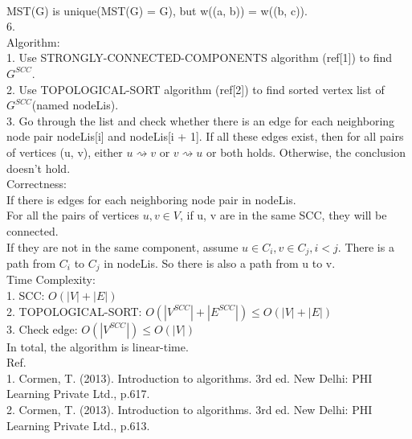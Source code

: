 \documentclass{article}
\begin{document}
\\

MST(G) is unique(MST(G) = G), but w((a, b)) = w((b, c)).\\

6.\\
Algorithm:\\
1. Use STRONGLY-CONNECTED-COMPONENTS algorithm (ref[1]) to find $G^{SCC}$.\\
2. Use TOPOLOGICAL-SORT algorithm (ref[2]) to find sorted vertex list of $G^{SCC}$(named nodeLis).\\
3. Go through the list and check whether there is an edge for each neighboring node pair nodeLis[i] and nodeLis[i + 1]. If all these edges exist, then for all pairs of vertices (u, v), either $u \rightsquigarrow v$ or $v \rightsquigarrow u$ or both holds. Otherwise, the conclusion doesn't hold.\\

Correctness:\\
If there is edges for each neighboring node pair in nodeLis.\\
For all the pairs of vertices $u, v \in V$, if u, v are in the same SCC, they will be connected.\\
If they are not in the same component, assume $u \in C_i, v \in C_j, i < j$. There is a path from $C_i$ to $C_j$ in nodeLis. So there is also a path from u to v.\\

Time Complexity:\\
1. SCC: $O(|V| + |E|)$\\
2. TOPOLOGICAL-SORT: $O(|V^{SCC}| + |E^{SCC}|) \leqslant O(|V| + |E|)$\\
3. Check edge: $O(|V^{SCC}|) \leqslant O(|V|)$\\
In total, the algorithm is linear-time.\\

Ref.\\
1. Cormen, T. (2013). Introduction to algorithms. 3rd ed. New Delhi: PHI Learning Private Ltd., p.617.\\
2. Cormen, T. (2013). Introduction to algorithms. 3rd ed. New Delhi: PHI Learning Private Ltd., p.613.\\
\end{document}
